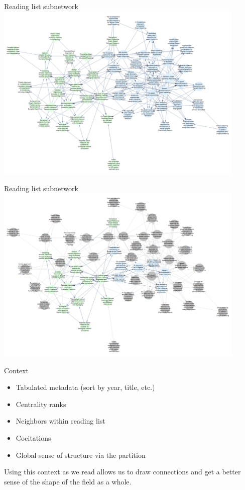 \documentclass[xcolor=dvipsnames, 14pt]{beamer}
\begin{document}
\begin{frame}{Reading list subnetwork}
\centering
\includegraphics[width=0.9\textwidth]{reading_list0pt9crop.png}
\end{frame}

\begin{frame}{Reading list subnetwork}
\centering
\includegraphics[width=0.9\textwidth]{reading_list_neighborhood0pt9crop.png}
\end{frame}

\begin{frame}{Context}
\begin{itemize}
\item Tabulated metadata (sort by year, title, etc.)
\item Centrality ranks
\item Neighbors within reading list
\item Cocitations
\item Global sense of structure via the partition
\end{itemize}
\pause
Using this context as we read allows us to draw connections and get a better sense of the shape of the field as a whole.
\end{frame}
\end{document}
